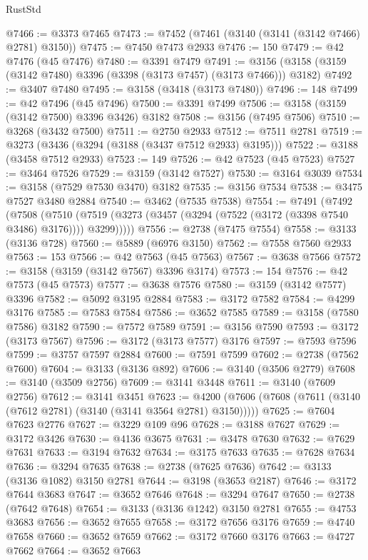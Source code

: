 \begin{lexlean}{RustStd}
\begin{coremodule}
@7466 := @3373 @7465
@7473 := @7452 (@7461 (@3140 (@3141 (@3142 @7466) @2781) @3150))
@7475 := @7450 @7473 @2933
@7476 := 150
@7479 := @42 @7476 (@45 @7476)
@7480 := @3391 @7479
@7491 := @3156 (@3158 (@3159 (@3142 @7480) @3396 (@3398 (@3173 @7457) (@3173 @7466))) @3182)
@7492 := @3407 @7480
@7495 := @3158 (@3418 (@3173 @7480))
@7496 := 148
@7499 := @42 @7496 (@45 @7496)
@7500 := @3391 @7499
@7506 := @3158 (@3159 (@3142 @7500) @3396 @3426) @3182
@7508 := @3156 (@7495 @7506)
@7510 := @3268 (@3432 @7500)
@7511 := @2750 @2933
@7512 := @7511 @2781
@7519 := @3273 (@3436 (@3294 (@3188 (@3437 @7512 @2933) @3195)))
@7522 := @3188 (@3458 @7512 @2933)
@7523 := 149
@7526 := @42 @7523 (@45 @7523)
@7527 := @3464 @7526
@7529 := @3159 (@3142 @7527)
@7530 := @3164 @3039
@7534 := @3158 (@7529 @7530 @3470) @3182
@7535 := @3156 @7534
@7538 := @3475 @7527 @3480 @2884
@7540 := @3462 (@7535 @7538)
@7554 := @7491
    (@7492
      (@7508
        (@7510 (@7519 (@3273 (@3457 (@3294 (@7522 (@3172 (@3398 @7540 @3486) @3176)))) @3299)))))
@7556 := @2738 (@7475 @7554)
@7558 := @3133 (@3136 @728)
@7560 := @5889 (@6976 @3150)
@7562 := @7558 @7560 @2933
@7563 := 153
@7566 := @42 @7563 (@45 @7563)
@7567 := @3638 @7566
@7572 := @3158 (@3159 (@3142 @7567) @3396 @3174)
@7573 := 154
@7576 := @42 @7573 (@45 @7573)
@7577 := @3638 @7576
@7580 := @3159 (@3142 @7577) @3396
@7582 := @5092 @3195 @2884
@7583 := @3172 @7582
@7584 := @4299 @3176
@7585 := @7583 @7584
@7586 := @3652 @7585
@7589 := @3158 (@7580 @7586) @3182
@7590 := @7572 @7589
@7591 := @3156 @7590
@7593 := @3172 (@3173 @7567)
@7596 := @3172 (@3173 @7577) @3176
@7597 := @7593 @7596
@7599 := @3757 @7597 @2884
@7600 := @7591 @7599
@7602 := @2738 (@7562 @7600)
@7604 := @3133 (@3136 @892)
@7606 := @3140 (@3506 @2779)
@7608 := @3140 (@3509 @2756)
@7609 := @3141 @3448
@7611 := @3140 (@7609 @2756)
@7612 := @3141 @3451
@7623 := @4200 (@7606 (@7608 (@7611 (@3140 (@7612 @2781) (@3140 (@3141 @3564 @2781) @3150)))))
@7625 := @7604 @7623 @2776
@7627 := @3229 @109 @96
@7628 := @3188 @7627
@7629 := @3172 @3426
@7630 := @4136 @3675
@7631 := @3478 @7630
@7632 := @7629 @7631
@7633 := @3194 @7632
@7634 := @3175 @7633
@7635 := @7628 @7634
@7636 := @3294 @7635
@7638 := @2738 (@7625 @7636)
@7642 := @3133 (@3136 @1082) @3150 @2781
@7644 := @3198 (@3653 @2187)
@7646 := @3172 @7644 @3683
@7647 := @3652 @7646
@7648 := @3294 @7647
@7650 := @2738 (@7642 @7648)
@7654 := @3133 (@3136 @1242) @3150 @2781
@7655 := @4753 @3683
@7656 := @3652 @7655
@7658 := @3172 @7656 @3176
@7659 := @4740 @7658
@7660 := @3652 @7659
@7662 := @3172 @7660 @3176
@7663 := @4727 @7662
@7664 := @3652 @7663

\end{coremodule}
\end{lexlean}
